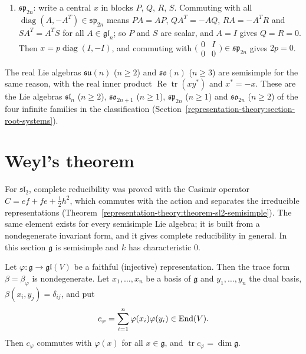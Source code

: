 \begin{example}
\begin{enumerate}
preserves $\operatorname{span}(e_i, e_j) \cap \operatorname{span}(e_i, e_l) = \CC e_i$; so $x$ is diagonal, and a diagonal skew-symmetric matrix is $0$. (For $n = 2$,
$\mathfrak{so}_2$ is one-dimensional, hence abelian.)
\item $\mathfrak{sp}_{2n}$: write a central $x$ in blocks $P$, $Q$, $R$, $S$. Commuting with all $\operatorname{diag}(A, -A^T) \in \mathfrak{sp}_{2n}$ means $PA = AP$,
$QA^T = -AQ$, $RA = -A^TR$ and $SA^T = A^TS$ for all $A \in \mathfrak{gl}_n$; so $P$ and $S$ are scalar, and $A = I$ gives $Q = R = 0$. Then $x = p\operatorname{diag}(I, -I)$, and
commuting with $\bigl(\begin{smallmatrix}0 & I\\ 0 & 0\end{smallmatrix}\bigr) \in \mathfrak{sp}_{2n}$ gives $2p = 0$.
\end{enumerate}
The real Lie algebras $\mathfrak{su}(n)$ ($n \geq 2$) and $\mathfrak{so}(n)$ ($n \geq 3$) are semisimple for the same reason, with the real inner product
$\operatorname{Re}\operatorname{tr}(xy^*)$ and $x^* = -x$. These are the Lie algebras $\mathfrak{sl}_n$ ($n \geq 2$), $\mathfrak{so}_{2n+1}$ ($n \geq 1$), $\mathfrak{sp}_{2n}$
($n \geq 1$) and $\mathfrak{so}_{2n}$ ($n \geq 2$) of the four infinite families in the classification (Section~\ref{representation-theory:section-root-systems}).
\end{example}

\section{Weyl's theorem}\label{representation-theory:section-weyl}

For $\mathfrak{sl}_2$, complete reducibility was proved with the Casimir operator $C = ef + fe + \frac12h^2$, which commutes with the action and separates the irreducible
representations (Theorem~\ref{representation-theory:theorem-sl2-semisimple}). The same element exists for every semisimple Lie algebra; it is built from a nondegenerate invariant
form, and it gives complete reducibility in general. In this section $\mathfrak{g}$ is semisimple and $k$ has characteristic $0$.

\begin{lemma}\label{representation-theory:lemma-casimir}
Let $\varphi \colon \mathfrak{g} \to \mathfrak{gl}(V)$ be a faithful (injective) representation. Then the trace form $\beta = \beta_\varphi$ is nondegenerate. Let $x_1, \ldots, x_n$ be
a basis of $\mathfrak{g}$ and $y_1, \ldots, y_n$ the dual basis, $\beta(x_i, y_j) = \delta_{ij}$, and put
\[
c_\varphi = \sum_{i=1}^n\varphi(x_i)\varphi(y_i) \in \operatorname{End}(V).
\]
Then $c_\varphi$ commutes with $\varphi(x)$ for all $x \in \mathfrak{g}$, and $\operatorname{tr}c_\varphi = \dim\mathfrak{g}$.
\end{lemma}

